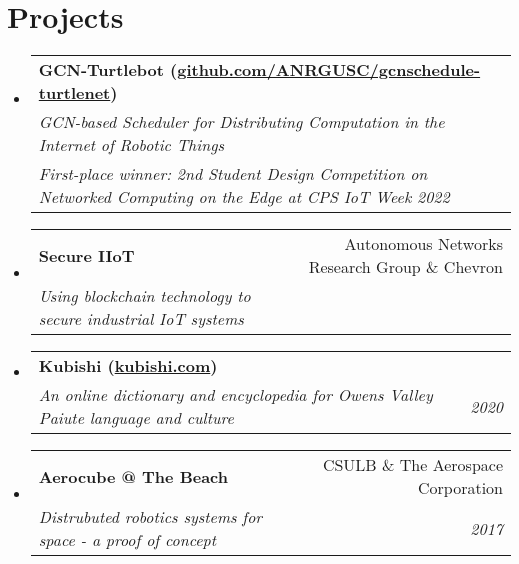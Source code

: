 \documentclass[letterpaper,11pt]{article}
\makeatletter
\newcommand{\resumeSubheading}[4]{
  \vspace{-1pt}\item[]
    \begin{tabular*}{0.97\textwidth}{l@{\extracolsep{\fill}}r}
      \textbf{#1} & #2 \\
      \textit{\small#3} & \textit{\small #4} \\
    \end{tabular*}\vspace{-5pt}
}
\newcommand{\resumeSubheadingTwo}[6]{
  \vspace{-1pt}\item[]
    \begin{tabular*}{0.97\textwidth}{l@{\extracolsep{\fill}}r}
      \textbf{#1} & #2 \\
      \textit{\small#3} & \textit{\small #4} \\
      \textit{\small#5} & \textit{\small #6}
    \end{tabular*}\vspace{-5pt}
}
\newcommand{\resumeSubHeadingListStart}{\begin{itemize}[leftmargin=*]}
\newcommand{\resumeSubHeadingListEnd}{\end{itemize}}
\makeatother
\begin{document}
\section{Projects}
\resumeSubHeadingListStart
    \resumeSubheadingTwo
    {GCN-Turtlebot (\href{https://github.com/ANRGUSC/gcnschedule-turtlenet}{github.com/ANRGUSC/gcnschedule-turtlenet})}{}
    {GCN-based Scheduler for Distributing Computation in the Internet of Robotic Things}{}
    {First-place winner: 2nd Student Design Competition on Networked Computing on the Edge at CPS IoT Week 2022}{}

    \resumeSubheading
    {Secure IIoT}{Autonomous Networks Research Group \& Chevron}
    {Using blockchain technology to secure industrial IoT systems}{}

    \resumeSubheading
    {Kubishi (\href{https://kubishi.com}{kubishi.com})}{}
    {An online dictionary and encyclopedia for Owens Valley Paiute language and culture}{2020}
    
    \resumeSubheading
    {Aerocube @ The Beach}{CSULB \& The Aerospace Corporation}
    {Distrubuted robotics systems for space - a proof of concept}{2017}
\resumeSubHeadingListEnd

\end{document}
